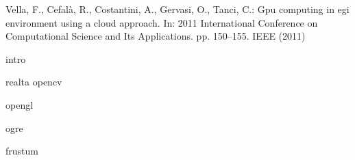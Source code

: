 \begin{thebibliography}{10}

Vella, F., Cefal\`a, R., Costantini, A., Gervasi, O., Tanci, C.: Gpu computing
  in egi environment using a cloud approach. In: 2011 International Conference
  on Computational Science and Its Applications. pp. 150--155. IEEE (2011)
  
intro

realta
%
opencv
%
%


opengl

ogre


frustum



\end{thebibliography}
